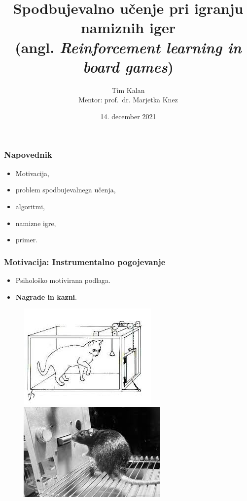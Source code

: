 \documentclass{beamer}    %
\author{Tim Kalan \\ \medskip
        \footnotesize Mentor: prof.~dr. Marjetka Knez}
\institute[FMF]{Fakulteta za matematiko in fiziko}
\title{
    Spodbujevalno učenje pri igranju namiznih iger \\ 
    \large (angl. \textit{Reinforcement learning in board games})}
\date{14. december 2021}
\begin{document}
\begin{frame}
    \titlepage
\end{frame}


\begin{frame}
    \frametitle{Napovednik}
    \begin{itemize}
        \item Motivacija, 
        \item problem spodbujevalnega učenja, 
        \item algoritmi, 
        \item namizne igre, 
        \item primer.
    \end{itemize}
\end{frame}


\begin{frame}
    \frametitle{Motivacija: Instrumentalno pogojevanje}
    \begin{itemize}
        \item Psihološko motivirana podlaga. 
        \item \textbf{Nagrade in kazni}.
    \end{itemize}

    \begin{figure}[b]
        \includegraphics[scale=0.47]{slike/macka.jpg}
        \includegraphics[scale=0.5]{slike/miska.jpg}
    \end{figure}
            
\end{frame}
\end{document}
